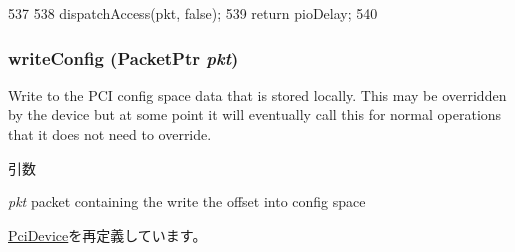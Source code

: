 \begin{DoxyCode}
537 {
538     dispatchAccess(pkt, false);
539     return pioDelay;
540 }
\end{DoxyCode}
\hypertarget{classIdeController_aac7b61a78530109bfa20923a53064bbf}{
\subsubsection[{writeConfig}]{ writeConfig ({\bf PacketPtr} {\em pkt})}}
\label{classIdeController_aac7b61a78530109bfa20923a53064bbf}
Write to the PCI config space data that is stored locally. This may be overridden by the device but at some point it will eventually call this for normal operations that it does not need to override. 
\begin{DoxyParams}{引数}
\item[{\em pkt}]packet containing the write the offset into config space \end{DoxyParams}


\hyperlink{classPciDevice_aac7b61a78530109bfa20923a53064bbf}{PciDevice}を再定義しています。


